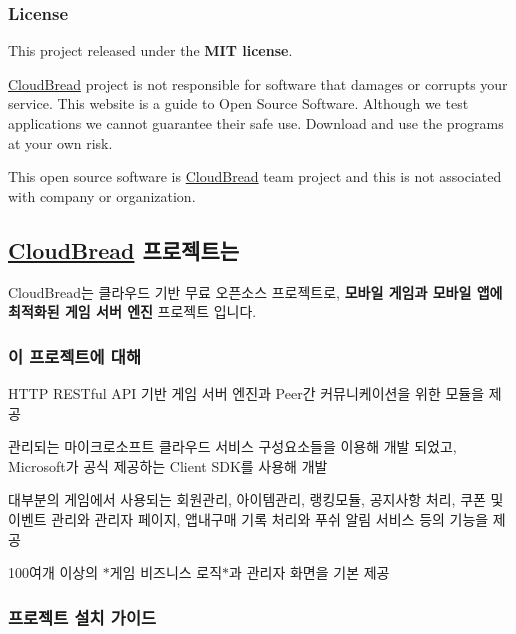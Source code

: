 \subsubsection*{License}


\begin{DoxyItemize}
\item This project released under the {\bfseries M\+IT license}.
\item \hyperlink{a00217}{Cloud\+Bread} project is not responsible for software that damages or corrupts your service. This website is a guide to Open Source Software. Although we test applications we cannot guarantee their safe use. Download and use the programs at your own risk.
\item This open source software is \hyperlink{a00217}{Cloud\+Bread} team project and this is not associated with company or organization.
\end{DoxyItemize}





\subsection*{\hyperlink{a00217}{Cloud\+Bread} 프로젝트는}

Cloud\+Bread는 클라우드 기반 무료 오픈소스 프로젝트로, {\bfseries 모바일 게임과 모바일 앱에 최적화된 게임 서버 엔진} 프로젝트 입니다.

\subsubsection*{이 프로젝트에 대해}


\begin{DoxyItemize}
\item H\+T\+TP R\+E\+S\+Tful A\+PI 기반 게임 서버 엔진과 Peer간 커뮤니케이션을 위한 모듈을 제공
\item 관리되는 마이크로소프트 클라우드 서비스 구성요소들을 이용해 개발 되었고, Microsoft가 공식 제공하는 Client S\+D\+K를 사용해 개발
\item 대부분의 게임에서 사용되는 회원관리, 아이템관리, 랭킹모듈, 공지사항 처리, 쿠폰 및 이벤트 관리와 관리자 페이지, 앱내구매 기록 처리와 푸쉬 알림 서비스 등의 기능을 제공
\item 100여개 이상의 $\ast$게임 비즈니스 로직$\ast$과 관리자 화면을 기본 제공
\end{DoxyItemize}

\subsubsection*{프로젝트 설치 가이드}

